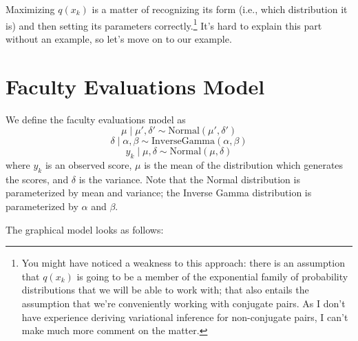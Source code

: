 \documentclass[12pt]{article}
\begin{document}
Maximizing $q(x_{k})$ is a matter of recognizing its form (i.e., which
distribution it is) and then setting its parameters correctly.\footnote{You
might have noticed a weakness to this approach:  there is an assumption that
$q(x_{k})$ is going to be a member of the exponential family of probability
distributions that we will be able to work with; that also entails the
assumption that we're conveniently working with conjugate pairs.  As I don't
have experience deriving variational inference for non-conjugate pairs, I can't
make much more comment on the matter.}  It's hard to explain this part without
an example, so let's move on to our example.

\section{Faculty Evaluations Model}

We define the faculty evaluations model as
\begin{equation}
    \mu \mid \mu', \delta' \sim \text{Normal}(\mu', \delta')
\end{equation}
\begin{equation}
    \delta \mid \alpha, \beta \sim \text{InverseGamma}(\alpha, \beta)
\end{equation}
\begin{equation}
    y_{k} \mid \mu, \delta \sim \text{Normal}(\mu, \delta)
\end{equation}
where $y_{k}$ is an observed score, $\mu$ is the mean of the distribution which
generates the scores, and $\delta$ is the variance.  Note that the Normal
distribution is parameterized by mean and variance; the Inverse Gamma
distribution is parameterized by $\alpha$ and $\beta$.

The graphical model looks as follows:
\begin{center}
\end{center}
\end{document}
